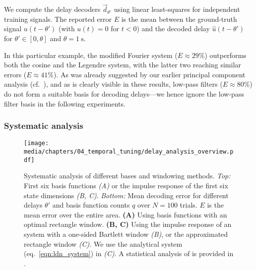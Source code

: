 We compute the delay decoders $\vec d_{\theta'}$ using linear least-squares for independent training signals.
The reported error $E$ is the mean \NRMSE between the ground-truth signal $u(t - \theta')$ (with $u(t) = 0$ for $t < 0$) and the decoded delay $\hat u(t - \theta')$ for $\theta' \in [0, \theta]$ and $\theta = \SI{1}{\second}$.

In this particular example, the modified Fourier system ($E \approx 29\%$) outperforms both the cosine and the Legendre system, with the latter two reaching similar errors ($E \approx 41\%$).
As was already suggested by our earlier principal component analysis (cf.~), and as is clearly visible in these results, low-pass filters ($E \approx 80\%$) do not form a suitable basis for decoding delays---we hence ignore the low-pass filter basis in the following experiments.

\subsubsection{Systematic analysis}

\begin{figure}[p]
	\centering
	\texttt{[image: media/chapters/04\_temporal\_tuning/delay\_analysis\_overview.pdf]}%
	{\label{fig:delay_analysis_overview_a}}%
	{\label{fig:delay_analysis_overview_b}}%
	{\label{fig:delay_analysis_overview_c}}%
	\caption[Systematic analysis of different bases and windowing methods]{Systematic analysis of different bases and windowing methods. \emph{Top:} First six basis functions \emph{(A)} or the impulse response of the first six state dimensions \emph{(B, C)}. \emph{Bottom:} Mean decoding error for different delays $\theta'$ and basis function counts $q$ over $N = 100$ trials.
	$E$ is the mean error over the entire area.
	\textbf{(A)} Using basis functions with an optimal rectangle window.
	\textbf{(B, C)} Using the impulse response of an \LTI system with a one-sided Bartlett window \emph{(B)}, or the approximated rectangle window \emph{(C)}.
	We use the analytical \LDN system (eq.~\ref{eqn:ldn_system}) in \emph{(C)}.
	A statistical analysis of is provided in .
	}
	\label{fig:delay_analysis_overview}
\end{figure}

